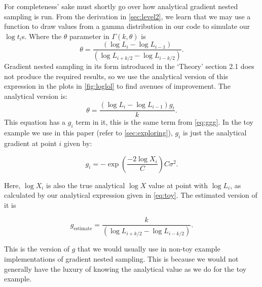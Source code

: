 For completeness' sake must shortly go over how analytical gradient nested sampling is run. From the derivation in \cref{sec:level2}, we learn that we may use a function to draw values from a gamma distribution in our code to simulate our $\log t_i$s. Where the $\theta$ parameter in $\Gamma (k,\theta)$ is 
%
\begin{equation}
   \theta = \frac{(\log L_i-\log L_{i-1})}{(\log L_{i+k/2}-\log L_{i-k/2})}.
\label{eq:t1}
\end{equation}
%
Gradient nested sampling in its form introduced in the `Theory' section 2.1 does not produce the required results, so we use the analytical version of this expression in the plots in \cref{fig:loglol} to find avenues of improvement. The analytical version is:
%
\begin{equation}
   \theta = \frac{(\log L_i-\log L_{i-1})g_i}{k}.
\label{eq:t2}
\end{equation}
%
This equation has a $g_i$ term in it, this is the same term from \cref{eq:ggg}. In the toy example we use in this paper (refer to \cref{sec:exploring}), $g_i$ is just the analytical gradient at point $i$ given by:

\begin{equation}
    g_i = -\exp(\frac{-2 \log X_i}{C})C \sigma^2.
\label{eq:nest}
\end{equation}


Here, $\log X_i$ is also the true analytical $\log X$ value at point with $\log L_i$, as calculated by our analytical expression given in \cref{eq:toy}. The estimated version of it is 

\begin{equation}
   g_{\mathrm{estimate}}= \frac{k}{(\log L_{i+k/2}-\log L_{i-k/2})}.
\label{eq:est}
\end{equation}


This is the version of $g$ that we would usually use in non-toy example implementations of gradient nested sampling. This is because we would not generally have the luxury of knowing the analytical value as we do for the toy example. 


